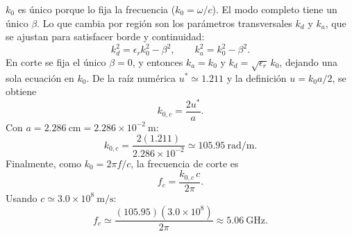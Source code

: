 \documentclass[
  11pt,
  letterpaper,
   addpoints,
   answers
  ]{exam}
\begin{document}
\begin{questions}
\begin{parts}
\begin{solution}
$k_0$ es único porque lo fija la frecuencia ($k_0=\omega/c$). El modo completo tiene un único $\beta$.
Lo que cambia por región son los parámetros transversales $k_d$ y $k_a$, que se ajustan para satisfacer borde y continuidad:
\[
k_d^2=\epsilon_r k_0^2-\beta^2,\qquad k_a^2=k_0^2-\beta^2.
\]
En corte se fija el único $\beta=0$, y entonces $k_a=k_0$ y $k_d=\sqrt{\epsilon_r}\,k_0$, dejando una sola ecuación en $k_0$. De la raíz numérica $u^\ast\simeq 1.211$ y la definición $u=k_0 a/2$, se obtiene
\[
k_{0,c}=\frac{2u^\ast}{a}.
\]
Con $a=2.286\ \text{cm}=2.286\times10^{-2}\ \text{m}$:
\[
k_{0,c}=\frac{2(1.211)}{2.286\times10^{-2}}
\simeq 105.95\ \text{rad/m}.
\]
Finalmente, como $k_0=2\pi f/c$, la frecuencia de corte es
\[
f_c=\frac{k_{0,c}\,c}{2\pi}.
\]
Usando $c\simeq 3.0\times10^8\ \text{m/s}$:
\[
f_c\simeq \frac{(105.95)(3.0\times10^{8})}{2\pi}\approx 5.06\ \text{GHz}.
\]

\end{solution}
\end{parts}


\end{questions}
\end{document}
